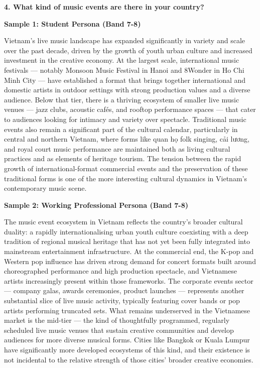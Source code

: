 \separator

\begin{ieltsquestion}
\textbf{4. What kind of music events are there in your country?}
\end{ieltsquestion}
\textbf{Sample 1: Student Persona (Band 7-8)}

Vietnam's live music landscape has expanded significantly in variety and scale over the past decade, driven by the growth of youth urban culture and increased investment in the creative economy. At the largest scale, international music festivals — notably Monsoon Music Festival in Hanoi and 8Wonder in Ho Chi Minh City — have established a format that brings together international and domestic artists in outdoor settings with strong production values and a diverse audience. Below that tier, there is a thriving ecosystem of smaller live music venues — jazz clubs, acoustic cafés, and rooftop performance spaces — that cater to audiences looking for intimacy and variety over spectacle. Traditional music events also remain a significant part of the cultural calendar, particularly in central and northern Vietnam, where forms like quan họ folk singing, cải lương, and royal court music performance are maintained both as living cultural practices and as elements of heritage tourism. The tension between the rapid growth of international-format commercial events and the preservation of these traditional forms is one of the more interesting cultural dynamics in Vietnam's contemporary music scene.

\textbf{Sample 2: Working Professional Persona (Band 7-8)}

The music event ecosystem in Vietnam reflects the country's broader cultural duality: a rapidly internationalising urban youth culture coexisting with a deep tradition of regional musical heritage that has not yet been fully integrated into mainstream entertainment infrastructure. At the commercial end, the K-pop and Western pop influence has driven strong demand for concert formats built around choreographed performance and high production spectacle, and Vietnamese artists increasingly present within those frameworks. The corporate events sector — company galas, awards ceremonies, product launches — represents another substantial slice of live music activity, typically featuring cover bands or pop artists performing truncated sets. What remains underserved in the Vietnamese market is the mid-tier — the kind of thoughtfully programmed, regularly scheduled live music venues that sustain creative communities and develop audiences for more diverse musical forms. Cities like Bangkok or Kuala Lumpur have significantly more developed ecosystems of this kind, and their existence is not incidental to the relative strength of those cities' broader creative economies.

